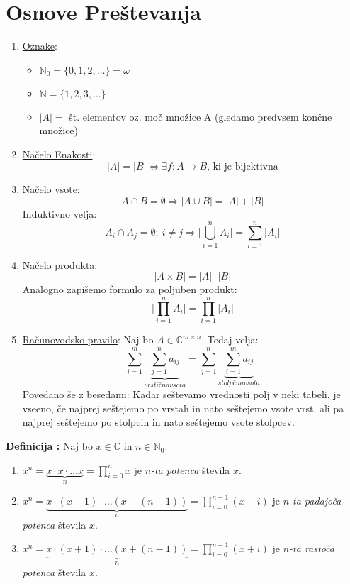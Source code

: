 \documentclass[a4paper, 10pt]{article}
\newcounter{defcount}
\newenvironment{definicija}{\begin{flushleft}\stepcounter{defcount}\textbf{Definicija \arabic{defcount}:}}{\hfill\end{flushleft}}
\newcommand{\abs}[1]{\ensuremath{\lvert #1 \rvert}}
\newcommand{\mth}[1]{\ensuremath{\mathbb{#1}}}
\newcommand{\pojem}[1]{\emph{#1}}
\begin{document}
\section{Osnove Preštevanja}
\begin{enumerate}

\item \underline{Oznake}:
\begin{itemize}

\item $\mth{N}_0 = \{0, 1, 2, \ldots \} = \omega$
\item $\mth{N} = \{1, 2, 3, \ldots \}$
\item $\abs{A} =$ št. elementov oz. moč množice A (gledamo predvsem končne množice) 

\end{itemize}

\item \underline{Načelo Enakosti}:
\[
\abs{A} = \abs{B} \iff \exists f : A \rightarrow B \text{, ki je bijektivna}
\]
\item \underline{Načelo vsote}:
\[
A \cap B = \emptyset \Rightarrow \abs{A \cup B} = \abs{A} + \abs{B}
\]
Induktivno velja:
\[
A_i \cap A_j = \emptyset; ~i\neq j \Rightarrow \abs{\bigcup^n_{i = 1}{A_i}} = \sum^n_{i = 1}{\abs{A_i}}
\]
\item \underline{Načelo produkta}:
\[
\abs{A\times B} = \abs{A} \cdot \abs{B}
\]
Analogno zapišemo formulo za poljuben produkt:
\[
\abs{\prod^n_{i = 1}{A_i}} = \prod^n_{i = 1}{\abs{A_i}}
\]
\item \underline{Računovodsko pravilo}:
Naj bo $A\in \mth{C}^{m \times n}$. Tedaj velja:
\[
\sum^m_{i = 1}{\underbrace{\sum^n_{j = 1}{a_{ij}}}_{vrstična vsota}} = \sum^n_{j = 1}{\underbrace{\sum^m_{i = 1}{a_{ij}}}_{stolpčna vsota}}
\]
Povedano še z besedami: Kadar seštevamo vrednosti polj v neki tabeli, je vseeno, če najprej seštejemo po vrstah in nato seštejemo vsote vrst, ali pa najprej seštejemo po stolpcih in nato seštejemo vsote stolpcev.
\end{enumerate}

\begin{definicija}
Naj bo $x \in \mth{C}$ in $n\in \mth{N}_0$.
\begin{enumerate}

\item $x^n = \underbrace{x\cdot x\cdot\ldots x}_{n} = \prod^{n}_{i = 0}{x}$ je \pojem{$n$-ta potenca} števila $x$.
\item $x^{\underline{n}} = \underbrace{x\cdot (x - 1)\cdot\ldots (x - (n - 1))}_{n} = \prod^{n - 1}_{i = 0}{(x - i)}$ je \pojem{$n$-ta padajoča potenca} števila $x$.
\item $x^{\bar{n}} = \underbrace{x\cdot (x + 1)\cdot\ldots (x + (n - 1))}_{n} = \prod^{n - 1}_{i = 0}{(x + i)}$ je \pojem{$n$-ta rastoča potenca} števila $x$.

\end{enumerate}

\end{definicija}
\end{document}
